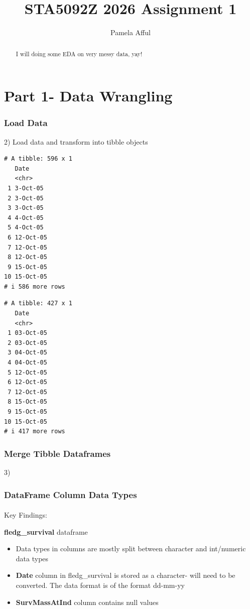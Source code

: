 \documentclass[
  letterpaper,
  DIV=11,
  numbers=noendperiod]{scrartcl}
\title{STA5092Z 2026 Assignment 1}
\author{Pamela Afful}
\date{}
\makeatletter
\let\oldparagraph\paragraph
\renewcommand{\paragraph}{
    \@ifstar
      \xxxParagraphStar
      \xxxParagraphNoStar
  }
\newcommand{\xxxParagraphStar}[1]{\oldparagraph*{#1}\mbox{}}
\newcommand{\xxxParagraphNoStar}[1]{\oldparagraph{#1}\mbox{}}
\makeatother
\begin{document}
\maketitle
\begin{abstract}
I will doing some EDA on very messy data, yay!
\end{abstract}


\section{Part 1- Data Wrangling}\label{part-1--data-wrangling}

\subsubsection{Load Data}\label{load-data}

2) Load data and transform into tibble objects

\begin{verbatim}
# A tibble: 596 x 1
   Date     
   <chr>    
 1 3-Oct-05 
 2 3-Oct-05 
 3 3-Oct-05 
 4 4-Oct-05 
 5 4-Oct-05 
 6 12-Oct-05
 7 12-Oct-05
 8 12-Oct-05
 9 15-Oct-05
10 15-Oct-05
# i 586 more rows
\end{verbatim}

\begin{verbatim}
# A tibble: 427 x 1
   Date     
   <chr>    
 1 03-Oct-05
 2 03-Oct-05
 3 04-Oct-05
 4 04-Oct-05
 5 12-Oct-05
 6 12-Oct-05
 7 12-Oct-05
 8 15-Oct-05
 9 15-Oct-05
10 15-Oct-05
# i 417 more rows
\end{verbatim}

\subsubsection{Merge Tibble Dataframes}\label{merge-tibble-dataframes}

3)

\subsubsection{DataFrame Column Data
Types}\label{dataframe-column-data-types}

\paragraph{Key Findings:}\label{key-findings}

\textbf{fledg\_survival} dataframe

\begin{itemize}
\item
  Data types in columns are mostly split between character and
  int/numeric data types
\item
  \textbf{Date} column in fledg\_survival is stored as a character- will
  need to be converted. The data format is of the format dd-mm-yy
\item
  \textbf{SurvMassAtInd} column contains null values
\end{itemize}
\end{document}
